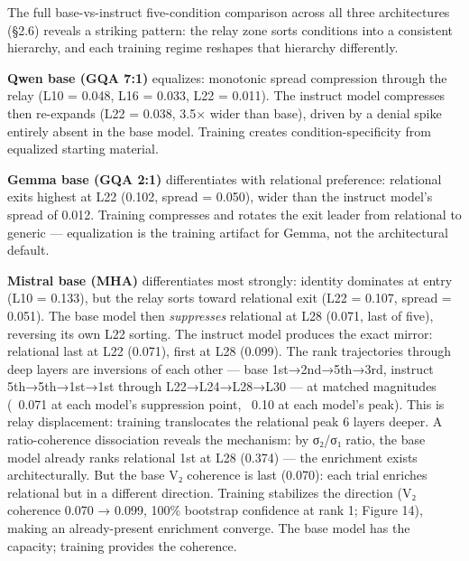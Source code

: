 \documentclass[12pt]{article}
\begin{document}
The full base-vs-instruct five-condition comparison across all three architectures (§2.6) reveals a striking pattern: the relay zone sorts conditions into a consistent hierarchy, and each training regime reshapes that hierarchy differently.

\textbf{Qwen base (GQA 7:1)} equalizes: monotonic spread compression through the relay (L10 = 0.048, L16 = 0.033, L22 = 0.011). The instruct model compresses then re-expands (L22 = 0.038, 3.5× wider than base), driven by a denial spike entirely absent in the base model. Training creates condition-specificity from equalized starting material.

\textbf{Gemma base (GQA 2:1)} differentiates with relational preference: relational exits highest at L22 (0.102, spread = 0.050), wider than the instruct model's spread of 0.012. Training compresses and rotates the exit leader from relational to generic — equalization is the training artifact for Gemma, not the architectural default.

\textbf{Mistral base (MHA)} differentiates most strongly: identity dominates at entry (L10 = 0.133), but the relay sorts toward relational exit (L22 = 0.107, spread = 0.051). The base model then \textit{suppresses} relational at L28 (0.071, last of five), reversing its own L22 sorting. The instruct model produces the exact mirror: relational last at L22 (0.071), first at L28 (0.099). The rank trajectories through deep layers are inversions of each other — base 1st→2nd→5th→3rd, instruct 5th→5th→1st→1st through L22→L24→L28→L30 — at matched magnitudes (~0.071 at each model's suppression point, ~0.10 at each model's peak). This is relay displacement: training translocates the relational peak 6 layers deeper. A ratio-coherence dissociation reveals the mechanism: by σ₂/σ₁ ratio, the base model already ranks relational 1st at L28 (0.374) — the enrichment exists architecturally. But the base V₂ coherence is last (0.070): each trial enriches relational but in a different direction. Training stabilizes the direction (V₂ coherence 0.070 → 0.099, 100\% bootstrap confidence at rank 1; Figure 14), making an already-present enrichment converge. The base model has the capacity; training provides the coherence.
\end{document}
